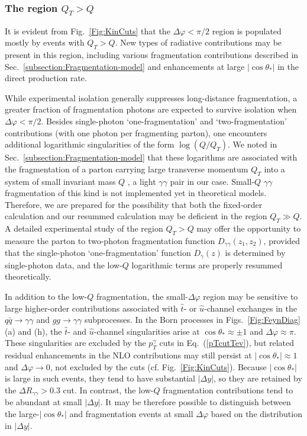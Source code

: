 \documentclass[12pt,english,aps,preprint,prd,letterpaper,fleqn,nofootinbib,showpacs,showkeys,tightenlines,floatfix]{revtex4}
\begin{document}
\subsubsection{The region $Q_{T}>Q$ \label{subsection:QT_gt_Q}}

It is evident from Fig.~\ref{Fig:KinCuts} that the $\Delta\varphi<\pi/2$
region is populated mostly by events with $Q_{T}>Q$. New types of
radiative contributions may be present in this region, including
various fragmentation contributions described 
in Sec.~\ref{subsection:Fragmentation-model} 
and enhancements at large $|\cos\theta_{*}|$ in the direct production rate. 

While experimental isolation generally suppresses long-distance fragmentation,
a greater fraction of fragmentation photons are expected to survive
isolation when $\Delta\varphi<\pi/2$. Besides single-photon `one-fragmentation'
and `two-fragmentation' contributions (with one photon per fragmenting
parton), one encounters additional logarithmic singularities of the
form $\log(Q/Q_{T})$. We noted in Sec.~\ref{subsection:Fragmentation-model}
that these logarithms are associated with the fragmentation of a parton
carrying large transverse momentum $Q_{T}$ into a system of small
invariant mass $Q$ \cite{Berger:1998ev,Berger:2001wr}, a light $\gamma\gamma$
pair in our case. Small-$Q$ $\gamma\gamma$ fragmentation of this
kind is not implemented yet in theoretical models. Therefore, we are
prepared for the possibility that both the fixed-order calculation
and our resummed calculation may be deficient in the region $Q_{T}\gg Q$.
A detailed experimental study of the region $Q_{T}>Q$ may offer the
opportunity to measure the parton to two-photon fragmentation function
$D_{\gamma\gamma}(z_{1},z_{2})$, provided that the single-photon
`one-fragmentation' function $D_{\gamma}(z)$ is determined by single-photon
data, and the low-$Q$ logarithmic terms are properly resummed theoretically.

In addition to the low-$Q$ fragmentation, the small-$\Delta\varphi$ region
may be sensitive to large higher-order contributions associated with
$\widehat{t}$- or $\widehat{u}$-channel exchanges in the $q\bar{q}\rightarrow\gamma\gamma$
and $gg\rightarrow\gamma\gamma$ subprocesses. In the Born processes in
Figs.~\ref{Fig:FeynDiag}(a) and (h),
the $\widehat{t}$- and $\widehat{u}$-channel singularities arise
at $\cos\theta_{*}\approx\pm1$ and $\Delta\varphi\approx\pi$.
These singularities are excluded by the $p_{T}^{\gamma}$
cuts in Eq.~(\ref{pTcutTev}), but related residual enhancements
in the NLO contributions may still persist at $|\cos\theta_{*}|\approx1$ and
$\Delta\varphi\rightarrow0$, not excluded by the cuts (cf.  Fig.~\ref{Fig:KinCuts}). Because $\left| \cos \theta_*\right|$ is large in such events,
they tend to have substantial $|\Delta y|$, so they are retained
by the $\Delta R_{\gamma\gamma}>0.3$ cut. In contrast, the low-$Q$
fragmentation contributions tend to be abundant at small $|\Delta y|$.
It may be therefore possible to distinguish between the large-$|\cos\theta_{*}|$
and fragmentation events at small $\Delta\varphi$ based on the distribution
in $|\Delta y|$.
\end{document}
